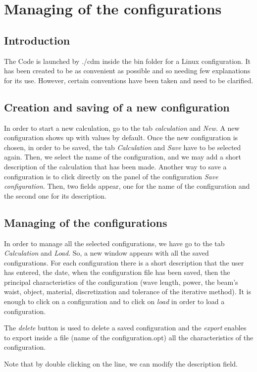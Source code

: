 \chapter{Managing of the configurations}\label{chap2}

\minitoc

\section{Introduction}


The Code is launched by ./cdm inside the bin folder for a Linux
configuration. It has been created to be as convenient as possible and
so needing few explanations for its use. However, certain conventions
have been taken and need to be clarified.

\section{Creation and saving of a new configuration}

In order to start a new calculation, go to the tab {\it calculation}
and {\it New}. A new configuration shows up with values by default.
Once the new configuration is chosen, in order to be saved, the tab
{\it Calculation} and {\it Save} have to be selected again.  Then, we
select the name of the configuration, and we may add a short
description of the calculation that has been made.  Another way to
save a configuration is to click directly on the panel of the
configuration {\it Save configuration}. Then, two fields appear, one
for the name of the configuration and the second one for its
description.

\section{Managing of the configurations}

In order to manage all the selected configurations, we have go to the
tab {\it Calculation} and {\it Load}. So, a new window appears with
all the saved configurations. For each configuration there is a short
description that the user has entered, the date, when the
configuration file has been saved, then the principal characteristics
of the configuration (wave length, power, the beam's waist, object,
material, discretization and tolerance of the iterative method). It is
enough to click on a configuration and to click on {\it load} in order
to load a configuration.

The {\it delete} button is used to delete a saved configuration and
the {\it export} enables to export inside a file (name of the
configuration.opt) all the characteristics of the configuration.

Note that by double clicking on the line, we can modify the
description field.


